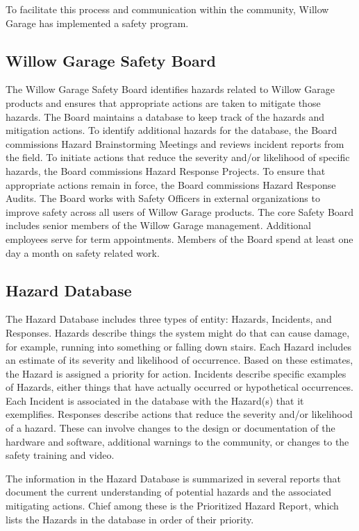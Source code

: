 To facilitate this process and communication within the community, Willow Garage has implemented a safety program.

\subsection{Willow Garage Safety Board}

The Willow Garage Safety Board identifies hazards related to Willow Garage products and ensures that appropriate actions are taken to mitigate those hazards. The Board maintains a database to keep track of the hazards and mitigation actions. To identify additional hazards for the database, the Board commissions Hazard Brainstorming Meetings and reviews incident reports from the field. To initiate actions that reduce the severity and/or likelihood of specific hazards, the Board commissions Hazard Response Projects. To ensure that appropriate actions remain in force, the Board commissions Hazard Response Audits. The Board works with Safety Officers in external organizations to improve safety across all users of Willow Garage products.
The core Safety Board includes senior members of the Willow Garage management. Additional employees serve for term appointments. Members of the Board spend at least one day a month on safety related work.
\subsection{Hazard Database}

The Hazard Database includes three types of entity: Hazards, Incidents, and Responses.
Hazards describe things the system might do that can cause damage, for example, running into something or falling down stairs. Each Hazard includes an estimate of its severity and likelihood of occurrence. Based on these estimates, the Hazard is assigned a priority for action.
Incidents describe specific examples of Hazards, either things that have actually occurred or hypothetical occurrences. Each Incident is associated in the database with the Hazard(s) that it exemplifies.
Responses describe actions that reduce the severity and/or likelihood of a hazard. These can involve changes to the design or documentation of the hardware and software, additional warnings to the community, or changes to the safety training and video.

The information in the Hazard Database is summarized in several reports that document the current understanding of potential hazards and the associated mitigating actions. Chief among these is the Prioritized Hazard Report, which lists the Hazards in the database in order of their priority.

